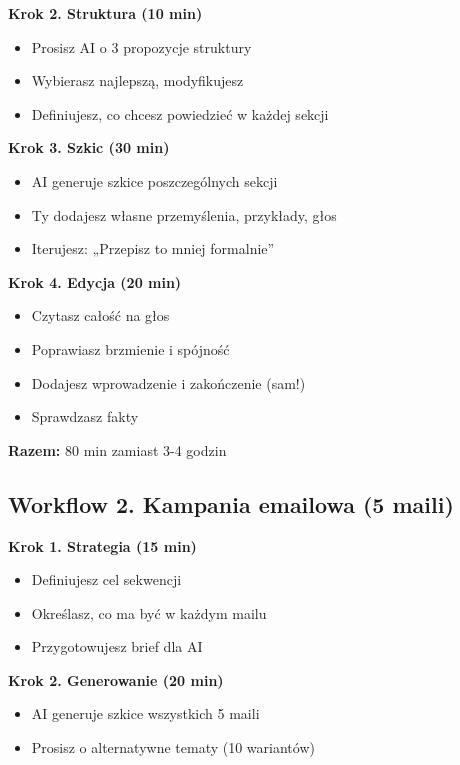 \documentclass[
  12pt,
  a4paper,
  twoside,
  openright,
  12pt,
  DIV=12,
  BCOR=12mm]{scrbook}
\providecommand{\tightlist}{%
  \setlength{\itemsep}{0pt}\setlength{\parskip}{0pt}}\usepackage{longtable,booktabs,array}
\begin{document}
\textbf{Krok 2. Struktura (10 min)}

\begin{itemize}
\tightlist
\item
  Prosisz AI o 3 propozycje struktury
\item
  Wybierasz najlepszą, modyfikujesz
\item
  Definiujesz, co chcesz powiedzieć w każdej sekcji
\end{itemize}

\textbf{Krok 3. Szkic (30 min)}

\begin{itemize}
\tightlist
\item
  AI generuje szkice poszczególnych sekcji
\item
  Ty dodajesz własne przemyślenia, przykłady, głos
\item
  Iterujesz: „Przepisz to mniej formalnie''
\end{itemize}

\textbf{Krok 4. Edycja (20 min)}

\begin{itemize}
\tightlist
\item
  Czytasz całość na głos
\item
  Poprawiasz brzmienie i spójność
\item
  Dodajesz wprowadzenie i zakończenie (sam!)
\item
  Sprawdzasz fakty
\end{itemize}

\textbf{Razem:} 80 min zamiast 3-4 godzin

\subsection{Workflow 2. Kampania emailowa (5
maili)}\label{workflow-2.-kampania-emailowa-5-maili}

\textbf{Krok 1. Strategia (15 min)}

\begin{itemize}
\tightlist
\item
  Definiujesz cel sekwencji
\item
  Określasz, co ma być w każdym mailu
\item
  Przygotowujesz brief dla AI
\end{itemize}

\textbf{Krok 2. Generowanie (20 min)}

\begin{itemize}
\tightlist
\item
  AI generuje szkice wszystkich 5 maili
\item
  Prosisz o alternatywne tematy (10 wariantów)
\end{itemize}
\end{document}
